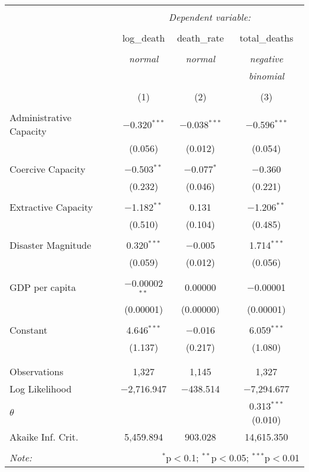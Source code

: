  \begin{table}[!htbp] \centering    \caption{}    \label{}  \begin{tabular}{@{\extracolsep{5pt}}lccc}  \\[-1.8ex]\hline  \hline \\[-1.8ex]   & \multicolumn{3}{c}{\textit{Dependent variable:}} \\  \cline{2-4}  \\[-1.8ex] & log\_death & death\_rate & total\_deaths \\  \\[-1.8ex] & \textit{normal} & \textit{normal} & \textit{negative} \\   & \textit{} & \textit{} & \textit{binomial} \\  \\[-1.8ex] & (1) & (2) & (3)\\  \hline \\[-1.8ex]   Administrative Capacity & $-$0.320$^{***}$ & $-$0.038$^{***}$ & $-$0.596$^{***}$ \\    & (0.056) & (0.012) & (0.054) \\    & & & \\   Coercive Capacity & $-$0.503$^{**}$ & $-$0.077$^{*}$ & $-$0.360 \\    & (0.232) & (0.046) & (0.221) \\    & & & \\   Extractive Capacity & $-$1.182$^{**}$ & 0.131 & $-$1.206$^{**}$ \\    & (0.510) & (0.104) & (0.485) \\    & & & \\   Disaster Magnitude & 0.320$^{***}$ & $-$0.005 & 1.714$^{***}$ \\    & (0.059) & (0.012) & (0.056) \\    & & & \\   GDP per capita & $-$0.00002$^{**}$ & 0.00000 & $-$0.00001 \\    & (0.00001) & (0.00000) & (0.00001) \\    & & & \\   Constant & 4.646$^{***}$ & $-$0.016 & 6.059$^{***}$ \\    & (1.137) & (0.217) & (1.080) \\    & & & \\  \hline \\[-1.8ex]  Observations & 1,327 & 1,145 & 1,327 \\  Log Likelihood & $-$2,716.947 & $-$438.514 & $-$7,294.677 \\  $\theta$ &  &  & 0.313$^{***}$  (0.010) \\  Akaike Inf. Crit. & 5,459.894 & 903.028 & 14,615.350 \\  \hline  \hline \\[-1.8ex]  \textit{Note:}  & \multicolumn{3}{r}{$^{*}$p$<$0.1; $^{**}$p$<$0.05; $^{***}$p$<$0.01} \\  \end{tabular}  \end{table} 